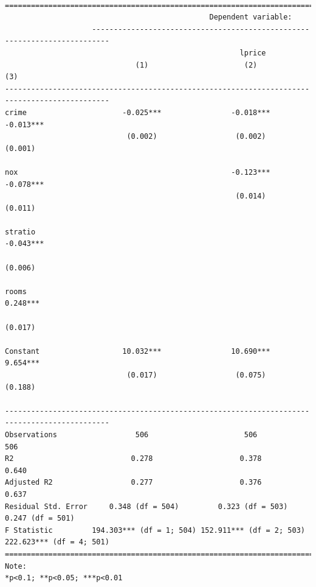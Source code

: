 \documentclass[
  letterpaper,
  DIV=11,
  numbers=noendperiod]{scrreprt}
\begin{document}
\begin{verbatim}

==============================================================================================
                                               Dependent variable:                            
                    --------------------------------------------------------------------------
                                                      lprice                                  
                              (1)                      (2)                      (3)           
----------------------------------------------------------------------------------------------
crime                      -0.025***                -0.018***                -0.013***        
                            (0.002)                  (0.002)                  (0.001)         
                                                                                              
nox                                                 -0.123***                -0.078***        
                                                     (0.014)                  (0.011)         
                                                                                              
stratio                                                                      -0.043***        
                                                                              (0.006)         
                                                                                              
rooms                                                                         0.248***        
                                                                              (0.017)         
                                                                                              
Constant                   10.032***                10.690***                 9.654***        
                            (0.017)                  (0.075)                  (0.188)         
                                                                                              
----------------------------------------------------------------------------------------------
Observations                  506                      506                      506           
R2                           0.278                    0.378                    0.640          
Adjusted R2                  0.277                    0.376                    0.637          
Residual Std. Error     0.348 (df = 504)         0.323 (df = 503)         0.247 (df = 501)    
F Statistic         194.303*** (df = 1; 504) 152.911*** (df = 2; 503) 222.623*** (df = 4; 501)
==============================================================================================
Note:                                                              *p<0.1; **p<0.05; ***p<0.01
\end{verbatim}
\end{document}
